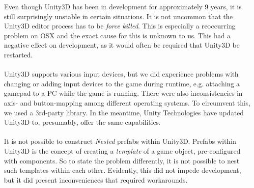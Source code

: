 Even though Unity3D has been in development for approximately 9 years, it is
still surprisingly unstable in certain situations. It is not uncommon that the
Unity3D editor process has to be \textit{force killed}. This is especially a
reoccurring problem on OSX and the exact cause for this is unknown to us. This
had a negative effect on development, as it would often be required that Unity3D
be restarted.
\\
\\
Unity3D supports various input devices, but we did experience problems with
changing or adding input devices to the game during runtime, e.g. attaching a
gamepad to a PC while the game is running. There were also inconsistencies in
axis- and button-mapping among different operating systems. To circumvent this,
we used a 3rd-party library. In the meantime, Unity Technologies have updated
Unity3D to, presumably, offer the same capabilities.
\\
\\
It is not possible to construct \textit{Nested} prefabs within Unity3D. Prefabs
within Unity3D is the concept of creating a \textit{template} of a game object,
pre-configured with components. So to state the problem differently, it is not
possible to nest such templates within each other. Evidently, this did not
impede development, but it did present inconveniences that required
workarounds.




%

